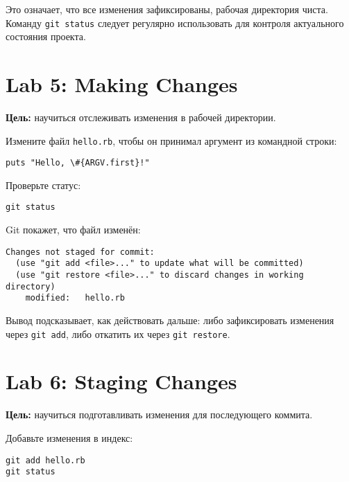 \documentclass[a4paper,12pt]{report}
\begin{document}
Это означает, что все изменения зафиксированы, рабочая директория чиста. Команду \texttt{git status} следует регулярно использовать для контроля актуального состояния проекта.


\section{Lab 5: Making Changes}
\textbf{Цель:} научиться отслеживать изменения в рабочей директории.

Измените файл \texttt{hello.rb}, чтобы он принимал аргумент из командной строки:

\begin{verbatim}
puts "Hello, \#{ARGV.first}!"
\end{verbatim}


Проверьте статус:
\begin{verbatim}
git status
\end{verbatim}

Git покажет, что файл изменён:
\begin{verbatim}
Changes not staged for commit:
  (use "git add <file>..." to update what will be committed)
  (use "git restore <file>..." to discard changes in working directory)
	modified:   hello.rb
\end{verbatim}

Вывод подсказывает, как действовать дальше: либо зафиксировать изменения через \texttt{git add}, либо откатить их через \texttt{git restore}.


\section{Lab 6: Staging Changes}
\textbf{Цель:} научиться подготавливать изменения для последующего коммита.

Добавьте изменения в индекс:
\begin{verbatim}
git add hello.rb
git status
\end{verbatim}
\end{document}
